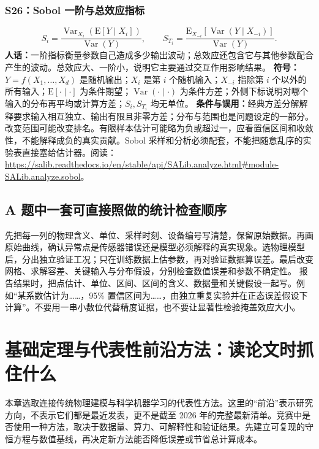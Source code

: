 \documentclass[UTF8,zihao=-4,openany,oneside,fontset=windows]{ctexbook}
\begin{document}
\subsection{S26：Sobol 一阶与总效应指标}
\begin{equation}
 S_i=\frac{\operatorname{Var}_{X_i}(\mathrm E[Y\mid X_i])}{\operatorname{Var}(Y)},\qquad
 S_{T_i}=\frac{\mathrm E_{X_{-i}}[\operatorname{Var}(Y\mid X_{-i})]}{\operatorname{Var}(Y)}.
\end{equation}
\textbf{人话：}一阶指标衡量参数自己造成多少输出波动；总效应还包含它与其他参数配合产生的波动。总效应大、一阶小，说明它主要通过交互作用影响结果。
\textbf{符号：}$Y=f(X_1,\ldots,X_d)$ 是随机输出；$X_i$ 是第 $i$ 个随机输入；$X_{-i}$ 指除第 $i$ 个以外的所有输入；$\mathrm E[\cdot\mid\cdot]$ 为条件期望；$\operatorname{Var}(\cdot\mid\cdot)$ 为条件方差；外侧下标说明对哪个输入的分布再平均或计算方差；$S_i,S_{T_i}$ 均无单位。
\textbf{条件与误用：}经典方差分解解释要求输入相互独立、输出有限且非零方差；分布与范围也是问题设定的一部分。改变范围可能改变排名。有限样本估计可能略为负或超过一，应看置信区间和收敛性，不能解释成负的真实贡献。Sobol 采样和分析必须配套，不能把随意乱序的实验表直接塞给估计器。阅读：\url{https://salib.readthedocs.io/en/stable/api/SALib.analyze.html#module-SALib.analyze.sobol}。

\section{A 题中一套可直接照做的统计检查顺序}
先把每一列的物理含义、单位、采样时刻、设备编号写清楚，保留原始数据。再画原始曲线，确认异常点是传感器错误还是模型必须解释的真实现象。选物理模型后，分出独立验证工况；只在训练数据上估参数，再对验证数据算误差。最后改变网格、求解容差、关键输入与分布假设，分别检查数值误差和参数不确定性。
报告结果时，把点估计、单位、区间、区间的含义、数据量和关键假设一起写。例如“某系数估计为……，95\% 置信区间为……，由独立重复实验并在正态误差假设下计算”。不要用一串小数位代替精度证据，也不要让显著性检验掩盖效应大小。


\chapter{基础定理与代表性前沿方法：读论文时抓住什么}
本章选取连接传统物理建模与科学机器学习的代表性方法。这里的“前沿”表示研究方向，不表示它们都是最近发表，更不是截至 2026 年的完整最新清单。竞赛中是否使用一种方法，取决于数据量、算力、可解释性和验证结果。先建立可复现的守恒方程与数值基线，再决定新方法能否降低误差或节省总计算成本。
\end{document}
